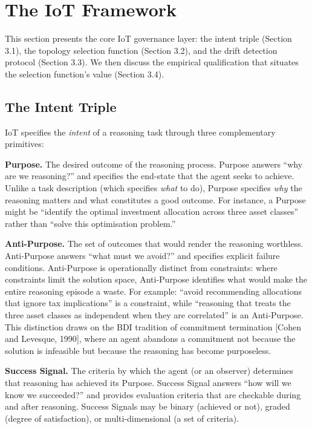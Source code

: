 \documentclass[11pt,a4paper]{article}
\begin{document}
\section{The IoT Framework}\label{the-iot-framework}

This section presents the core IoT governance layer: the intent triple
(Section 3.1), the topology selection function (Section 3.2), and the
drift detection protocol (Section 3.3). We then discuss the empirical
qualification that situates the selection function's value (Section
3.4).

\subsection{The Intent Triple}\label{the-intent-triple}

IoT specifies the \emph{intent} of a reasoning task through three
complementary primitives:

\textbf{Purpose.} The desired outcome of the reasoning process. Purpose
answers ``why are we reasoning?'' and specifies the end-state that the
agent seeks to achieve. Unlike a task description (which specifies
\emph{what} to do), Purpose specifies \emph{why} the reasoning matters
and what constitutes a good outcome. For instance, a Purpose might be
``identify the optimal investment allocation across three asset
classes'' rather than ``solve this optimisation problem.''

\textbf{Anti-Purpose.} The set of outcomes that would render the
reasoning worthless. Anti-Purpose answers ``what must we avoid?'' and
specifies explicit failure conditions. Anti-Purpose is operationally
distinct from constraints: where constraints limit the solution space,
Anti-Purpose identifies what would make the entire reasoning episode a
waste. For example: ``avoid recommending allocations that ignore tax
implications'' is a constraint, while ``reasoning that treats the three
asset classes as independent when they are correlated'' is an
Anti-Purpose. This distinction draws on the BDI tradition of commitment
termination {[}Cohen and Levesque, 1990{]}, where an agent abandons a
commitment not because the solution is infeasible but because the
reasoning has become purposeless.

\textbf{Success Signal.} The criteria by which the agent (or an
observer) determines that reasoning has achieved its Purpose. Success
Signal answers ``how will we know we succeeded?'' and provides
evaluation criteria that are checkable during and after reasoning.
Success Signals may be binary (achieved or not), graded (degree of
satisfaction), or multi-dimensional (a set of criteria).
\end{document}
